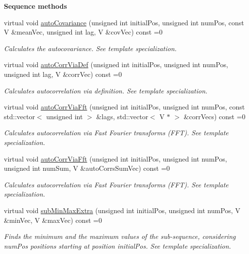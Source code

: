 \begin{Indent}{\bf Sequence methods}
\begin{DoxyCompactItemize}
virtual void \hyperlink{class_q_u_e_s_o_1_1_base_vector_sequence_a3a831c06c8ede53b84ce72fac3f018c0}{auto\-Covariance} (unsigned int initial\-Pos, unsigned int num\-Pos, const V \&mean\-Vec, unsigned int lag, V \&cov\-Vec) const =0
\begin{DoxyCompactList}\small\item\em Calculates the autocovariance. See template specialization. \end{DoxyCompactList}\item 
virtual void \hyperlink{class_q_u_e_s_o_1_1_base_vector_sequence_ab4d322b34c43ad47df9a76582a0693d0}{auto\-Corr\-Via\-Def} (unsigned int initial\-Pos, unsigned int num\-Pos, unsigned int lag, V \&corr\-Vec) const =0
\begin{DoxyCompactList}\small\item\em Calculates autocorrelation via definition. See template specialization. \end{DoxyCompactList}\item 
virtual void \hyperlink{class_q_u_e_s_o_1_1_base_vector_sequence_a709a63b678508c47bedd416ece5342ef}{auto\-Corr\-Via\-Fft} (unsigned int initial\-Pos, unsigned int num\-Pos, const std\-::vector$<$ unsigned int $>$ \&lags, std\-::vector$<$ V $\ast$ $>$ \&corr\-Vecs) const =0
\begin{DoxyCompactList}\small\item\em Calculates autocorrelation via Fast Fourier transforms (F\-F\-T). See template specialization. \end{DoxyCompactList}\item 
virtual void \hyperlink{class_q_u_e_s_o_1_1_base_vector_sequence_af9f2478ed4112aa615caef21bf26ab35}{auto\-Corr\-Via\-Fft} (unsigned int initial\-Pos, unsigned int num\-Pos, unsigned int num\-Sum, V \&auto\-Corrs\-Sum\-Vec) const =0
\begin{DoxyCompactList}\small\item\em Calculates autocorrelation via Fast Fourier transforms (F\-F\-T). See template specialization. \end{DoxyCompactList}\item 
virtual void \hyperlink{class_q_u_e_s_o_1_1_base_vector_sequence_a14fd8d5c3ff3fb2f7eb3f4b9e7131d0c}{sub\-Min\-Max\-Extra} (unsigned int initial\-Pos, unsigned int num\-Pos, V \&min\-Vec, V \&max\-Vec) const =0
\begin{DoxyCompactList}\small\item\em Finds the minimum and the maximum values of the sub-\/sequence, considering {\ttfamily num\-Pos} positions starting at position {\ttfamily initial\-Pos}. See template specialization. \end{DoxyCompactList}\item 

\end{DoxyCompactItemize}
\end{Indent}

